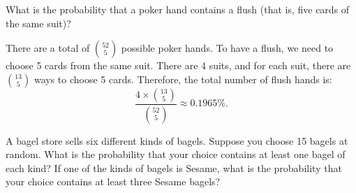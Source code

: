 \begin{problem}[56]
  What is the probability that a poker hand contains a flush (that is, five cards of the same suit)?
\end{problem}

\begin{solution}
  There are a total of $\binom{52}{5}$ possible poker hands. To have a flush, we need to choose 5 cards from the same suit. There are 4 suits, and for each suit, there are $\binom{13}{5}$ ways to choose 5 cards. Therefore, the total number of flush hands is:
  \[%
    \frac{4 \times \binom{13}{5}}{\binom{52}{5}} \approx 0.1965\%
  .\]%
\end{solution}

\begin{problem}[60]
  A bagel store sells six different kinds of bagels. Suppose you choose 15 bagels at random. What is the probability that your choice contains at least one bagel of each kind? If one of the kinds of bagels is Sesame, what is the probability that your choice contains at least three Sesame bagels?
\end{problem}

\begin{solution}
\end{solution}
